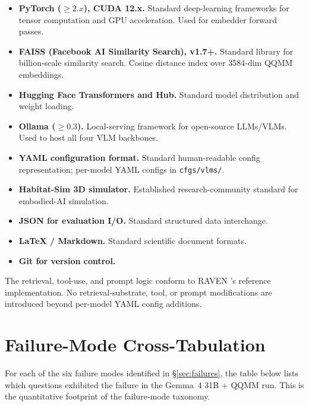\documentclass[12pt,letterpaper,oneside]{article}
\begin{document}
\begin{itemize}\setlength\itemsep{0pt}
  \item \textbf{PyTorch ($\ge2.x$), CUDA 12.x.}  Standard
    deep-learning frameworks for tensor computation and GPU
    acceleration.  Used for embedder forward passes.
  \item \textbf{FAISS (Facebook AI Similarity Search), v1.7+.}
    Standard library for billion-scale similarity search.  Cosine
    distance index over 3584-dim QQMM embeddings.
  \item \textbf{Hugging Face Transformers and Hub.}  Standard model
    distribution and weight loading.
  \item \textbf{Ollama ($\ge0.3$).}  Local-serving framework for
    open-source LLMs/VLMs.  Used to host all four VLM backbones.
  \item \textbf{YAML configuration format.}  Standard human-readable
    config representation; per-model YAML configs in
    \texttt{cfgs/vlms/}.
  \item \textbf{Habitat-Sim 3D simulator.}  Established
    research-community standard for embodied-AI simulation.
  \item \textbf{JSON for evaluation I/O.}  Standard structured data
    interchange.
  \item \textbf{LaTeX / Markdown.}  Standard scientific document
    formats.
  \item \textbf{Git for version control.}
\end{itemize}

The retrieval, tool-use, and prompt logic conform to RAVEN
\cite{ref:raven}'s reference implementation.  No retrieval-substrate,
tool, or prompt modifications are introduced beyond per-model YAML
config additions.

\section{Failure-Mode Cross-Tabulation}\label{app:xtab}

For each of the six failure modes identified in
\S\ref{sec:failures}, the table below lists which questions exhibited
the failure in the Gemma~4 31B + QQMM run.  This is the
quantitative footprint of the failure-mode taxonomy.
\end{document}
